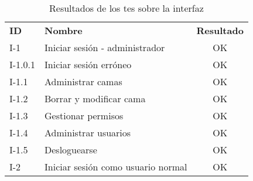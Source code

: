 \begin{table}
	\centering
	\begin{center}	
		\begin{tabular}{llc}
			\toprule
			\textbf{ID} & \textbf{Nombre} & \textbf{Resultado} \\
			\otoprule
			I-1 & Iniciar sesión - administrador & OK \\
			I-1.0.1 & Iniciar sesión erróneo & OK \\
			I-1.1 & Administrar camas & OK \\
			I-1.2 & Borrar y modificar cama & OK \\
			I-1.3 & Gestionar permisos & OK \\
			I-1.4 & Administrar usuarios & OK \\
			I-1.5 & Desloguearse & OK \\
			I-2 & Iniciar sesión como usuario normal & OK \\
			\bottomrule
		\end{tabular}
	\end{center}
	\caption{Resultados de los tes sobre la interfaz}
	\label{tab:test_selenium}
\end{table}